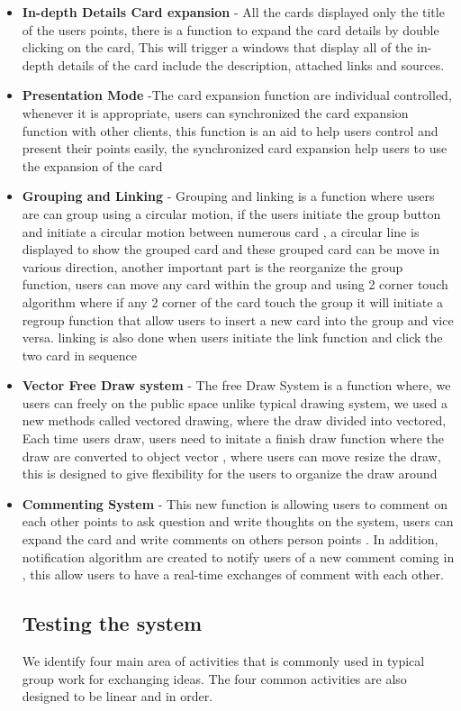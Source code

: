\documentclass{sigchi}
\begin{document}
\begin{itemize}
\begin{itemize}
\item  \textbf{In-depth Details Card expansion}   - All the cards displayed only the title of the users points, there is a function to expand the card details by double clicking on the card, This will trigger a windows that display all of the in-depth details of the card include the description, attached links and sources. 
\item  \textbf{Presentation Mode} -The card expansion function are individual controlled, whenever it is appropriate, users can synchronized the card expansion function with other clients, this function is an aid to help users control and present their points easily, the synchronized card expansion help users to use the expansion of the card 
\item \textbf{Grouping and Linking} -  Grouping and linking is a function where users are can group using a circular motion, if the users initiate the group button and initiate a circular motion between numerous card , a circular line is displayed to show the grouped card and these grouped card can be move in various direction, another important part is the reorganize the group function, users can move any card within the group and using 2 corner touch algorithm where if any 2 corner of the card touch the group it will initiate  a regroup function that allow users to insert a new card into the group and vice versa. linking is also done when users initiate the link function and click the two card in sequence  
\item \textbf{Vector Free Draw system} - The free Draw System is a function where, we users can freely on the public space unlike typical drawing system, we used a new methods called vectored drawing, where the draw divided into vectored, Each time users draw, users need to initate a finish draw function where the draw are converted to object vector , where users can move resize the draw, this is designed to give flexibility for the users to organize the draw around 
\item \textbf{Commenting System} - This new function is allowing users to comment on each other points to ask question and write  thoughts on the system, users can expand the card and write comments on others person points . In addition, notification algorithm are created to notify users of a new comment coming in , this allow users to have a real-time exchanges of comment with each other. 



\subsection{Testing the system}
We identify four main area of activities  that is commonly used  in typical group work for exchanging ideas. The four common activities are also designed to be linear and in order. 


\end{itemize}
\end{itemize}
\end{document}
